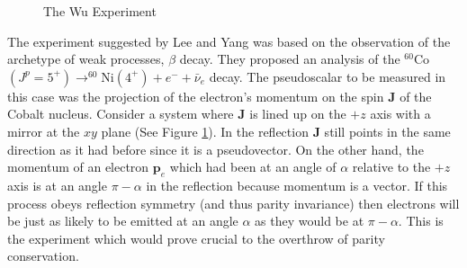 \documentclass[12pt]{book}
\begin{document}
\begin{figure}
\centering
{}
\caption{The Wu Experiment}
\label{fig:wu}
\end{figure}

The experiment suggested by Lee and Yang was based on the observation of the archetype of weak processes, $\beta$ decay. They proposed an analysis of the $^{60}$Co$(J^{p}=5^{+})\longrightarrow ^{60}$Ni$(4^{+})+e^{-}+\bar{\nu}_{e}$ decay. The pseudoscalar to be measured in this case was the projection of the electron's momentum on the spin $\mathbf{J}$ of the Cobalt nucleus. Consider a system where $\mathbf{J}$ is lined up on the $+z$ axis with a mirror at the $xy$ plane (See Figure \ref{fig:wu}). In the reflection $\mathbf{J}$ still points in the same direction as it had before since it is a pseudovector. On the other hand, the momentum of an electron $\mathbf{p}_{e}$ which had been at an angle of $\alpha$ relative to the $+z$ axis is at an angle $\pi - \alpha$ in the reflection because momentum is a vector. If this process obeys reflection symmetry (and thus parity invariance) then electrons will be just as likely to be emitted at an angle $\alpha$ as they would be at $\pi - \alpha$\cite{morii}. This is the experiment which would prove crucial to the overthrow of parity conservation.
\end{document}
